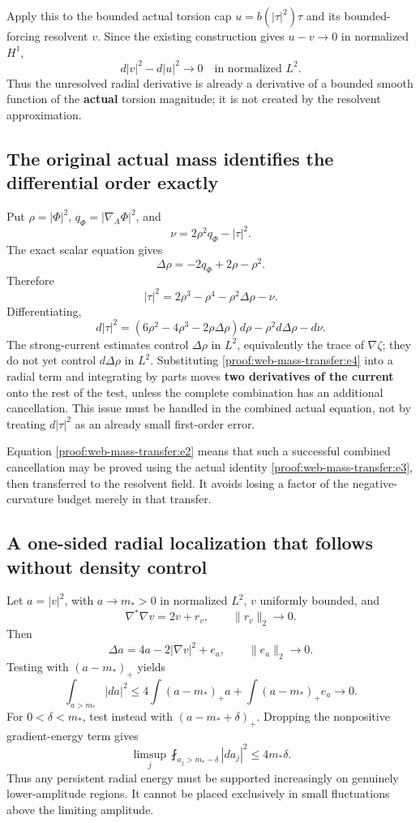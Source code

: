 Apply this to the bounded actual torsion cap \(u=b(|\tau|^2)\tau\) and its bounded-forcing resolvent \(v\). Since the existing construction gives \(u-v\to0\) in normalized \(H^1\), \[
d|v|^2-d|u|^2\to0\quad\text{in normalized }L^2.
\tag{\thesection.2}\label{proof:web-mass-transfer:e2}
\] Thus the unresolved radial derivative is already a derivative of a bounded smooth function of the \textbf{actual} torsion magnitude; it is not created by the resolvent approximation.

\hypertarget{proof:web-mass-transfer:s2}{%
\subsection{The original actual mass identifies the differential order exactly}\label{proof:web-mass-transfer:s2}}

Put \(\rho=|\Phi|^2\), \(q_\Phi=|\nabla_A\Phi|^2\), and \[
\nu=2\rho^2q_\Phi-|\tau|^2.
\] The exact scalar equation gives \[
\Delta\rho=-2q_\Phi+2\rho-\rho^2.
\] Therefore \[
\boxed{|\tau|^2=2\rho^3-\rho^4-\rho^2\Delta\rho-\nu.}
\tag{\thesection.3}\label{proof:web-mass-transfer:e3}
\] Differentiating, \[
d|\tau|^2
=(6\rho^2-4\rho^3-2\rho\Delta\rho)d\rho
 -\rho^2d\Delta\rho-d\nu.
\tag{\thesection.4}\label{proof:web-mass-transfer:e4}
\] The strong-current estimates control \(\Delta\rho\) in \(L^2\), equivalently the trace of \(\nabla\zeta\); they do not yet control \(d\Delta\rho\) in \(L^2\). Substituting \eqref{proof:web-mass-transfer:e4} into a radial term and integrating by parts moves \textbf{two derivatives of the current} onto the rest of the test, unless the complete combination has an additional cancellation. This issue must be handled in the combined actual equation, not by treating \(d|\tau|^2\) as an already small first-order error.

Equation \eqref{proof:web-mass-transfer:e2} means that such a successful combined cancellation may be proved using the actual identity \eqref{proof:web-mass-transfer:e3}, then transferred to the resolvent field. It avoids losing a factor of the negative-curvature budget merely in that transfer.

\hypertarget{proof:web-mass-transfer:s3}{%
\subsection{A one-sided radial localization that follows without density control}\label{proof:web-mass-transfer:s3}}

Let \(a=|v|^2\), with \(a\to m_*>0\) in normalized \(L^2\), \(v\) uniformly bounded, and \[
\nabla^*\nabla v=2v+r_v,\qquad \|r_v\|_2\to0.
\] Then \[
\Delta a=4a-2|\nabla v|^2+e_a,
\qquad\|e_a\|_2\to0.
\] Testing with \((a-m_*)_+\) yields \[
\int_{a>m_*}|da|^2
\le 4\int(a-m_*)_+a+\int(a-m_*)_+e_a\to0.
\tag{\thesection.5}\label{proof:web-mass-transfer:e5}
\] For \(0<\delta<m_*\), test instead with \((a-m_*+\delta)_+\). Dropping the nonpositive gradient-energy term gives \[
\limsup_j\fint_{a_j>m_*-\delta}|da_j|^2
\le 4m_*\delta.
\tag{\thesection.6}\label{proof:web-mass-transfer:e6}
\] Thus any persistent radial energy must be supported increasingly on genuinely lower-amplitude regions. It cannot be placed exclusively in small fluctuations above the limiting amplitude.

